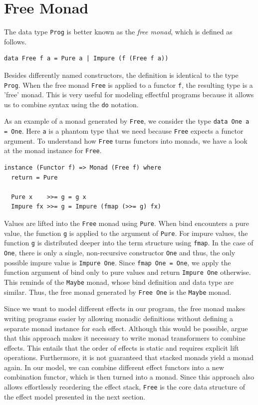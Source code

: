 \documentclass[a4paper, 11pt, fleqn, twoside, abstract=on]{scrreprt}
\newcommand{\hinl}[1]{\texttt{#1}}
\newcommand{\cinl}[1]{\texttt{#1}}
\begin{document}
\section{Free Monad}

The data type \hinl{Prog} is better known as the \textit{free monad}, which is defined as follows.

\begin{verbatim}
data Free f a = Pure a | Impure (f (Free f a))
\end{verbatim}

Besides differently named constructors, the definition is identical to the type \cinl{Prog}.
When the free monad \cinl{Free} is applied to a functor \cinl{f}, the resulting type is a 'free' monad.
This is very useful for modeling effectful programs because it allows us to combine syntax using the \hinl{do} notation.

As an example of a monad generated by \cinl{Free}, we consider the type \hinl{data One a = One}.
Here \hinl{a} is a phantom type that we need because \hinl{Free} expects a functor argument.
To understand how \cinl{Free} turns functors into monads, we have a look at the monad instance for \hinl{Free}.

\begin{verbatim}
instance (Functor f) => Monad (Free f) where
  return = Pure

  Pure x    >>= g = g x
  Impure fx >>= g = Impure (fmap (>>= g) fx)
\end{verbatim}

Values are lifted into the \cinl{Free} monad using \cinl{Pure}.
When bind encounters a pure value, the function \hinl{g} is applied to the argument of \hinl{Pure}.
For impure values, the function \hinl{g} is distributed deeper into the term structure using \hinl{fmap}.
In the case of \hinl{One}, there is only a single, non-recursive constructor \hinl{One} and thus, the only possible impure value is \hinl{Impure One}.
Since \hinl{fmap One = One}, we apply the function argument of bind only to pure values and return \cinl{Impure One} otherwise.
This reminds of the \hinl{Maybe} monad, whose bind definition and data type are similar.
Thus, the free monad generated by \hinl{Free One} is the \hinl{Maybe} monad.


Since we want to model different effects in our program, the free monad makes writing programs easier by allowing monadic definitions without defining a separate monad instance for each effect.
Although this would be possible, \citet{kammar2013handlers} argue that this approach makes it necessary to write monad transformers to combine effects.
This entails that the order of effects is static and requires explicit lift operations.
Furthermore, it is not guaranteed that stacked monads yield a monad again.
In our model, we can combine different effect functors into a new combination functor, which is then turned into a monad.
Since this approach also allows effortlessly reordering the effect stack, \hinl{Free} is the core data structure of the effect model presented in the next section.
\end{document}
